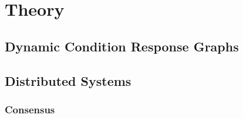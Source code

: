 \chapter{Theory}\label{chap:theory}
	\section{Dynamic Condition Response Graphs}
	\section{Distributed Systems}
		\subsection{Consensus}